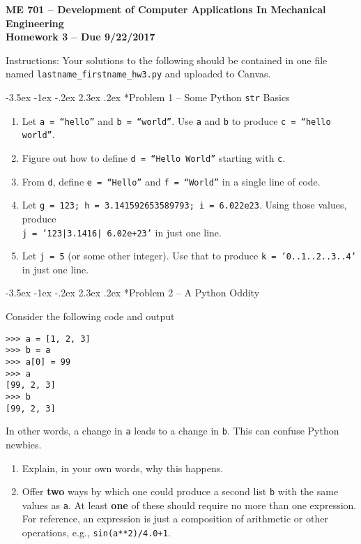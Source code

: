 \documentclass[11pt]{article}
\makeatletter
\renewcommand\section{\@startsection{section}{1}{\z@}%
                                  {-3.5ex \@plus -1ex \@minus -.2ex}%
                                  {2.3ex \@plus.2ex}%
                                  {\normalfont\bfseries}}
\makeatother
\begin{document}
{\large
  \begin{center}
    {\bf ME 701 -- Development of Computer Applications In Mechanical Engineering \\ 
         Homework 3 -- Due 9/22/2017}         
  \end{center}
}
 
Instructions:  Your solutions to the following should be contained in
one file named {\tt lastname\_firstname\_hw3.py} and uploaded to Canvas.


\section*{Problem 1 -- Some Python \texttt{str} Basics}

\begin{enumerate}
\item Let \texttt{a = ``hello''} and \texttt{b = ``world''}.  Use 
      \texttt{a} and  \texttt{b} to produce \texttt{c = ``hello world''}.
\item Figure out how to define \texttt{d = ``Hello World''} starting with 
      \texttt{c}.
\item From \texttt{d}, define \texttt{e = ``Hello''} and  \texttt{f = ``World''}
      in a single line of code.
\item Let  \texttt{g = 123; h = 3.141592653589793; i = 6.022e23}.  Using those 
      values, produce \\ \texttt{j = '123|3.1416| 6.02e+23'} in just one line.
\item Let \texttt{j = 5} (or some other integer).  Use that to produce 
      \texttt{k =  '0..1..2..3..4'} in just one line.
\end{enumerate} 

\section*{Problem 2 -- A Python Oddity}

Consider the following code and output
\begin{verbatim}
>>> a = [1, 2, 3]
>>> b = a
>>> a[0] = 99
>>> a
[99, 2, 3]
>>> b
[99, 2, 3]
\end{verbatim}
In other words, a change in \texttt{a} leads to
a change in \texttt{b}.  This can confuse Python
newbies.  
\begin{enumerate}
 \item Explain, in your own words, why this happens.
 \item Offer {\bf two} ways by which one could 
       produce a second list \texttt{b} with the same 
       values as \texttt{a}.  At least {\bf one} of 
       these should require no more than one 
       expression.  For reference, an expression is 
       just a composition of arithmetic or other operations, e.g.,
       \texttt{sin(a**2)/4.0+1}.
\end{enumerate}
\end{document}
